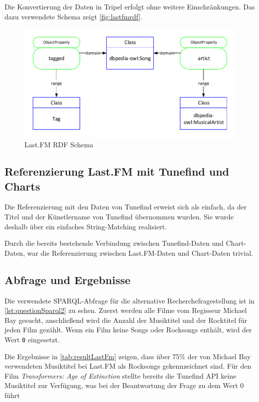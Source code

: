\documentclass[parskip]{scrartcl}
\begin{document}


Die Konvertierung der Daten in Tripel erfolgt ohne weitere Einschränkungen. Das dazu verwendete Schema zeigt \autoref{fig:lastfmrdf}.

\begin{figure}[H]
    \centering
    \includegraphics[scale=0.8]{lastfm}
    \caption{Last.FM RDF Schema}
    \label{fig:lastfmrdf}
\end{figure}

\subsection{Referenzierung Last.FM mit Tunefind und Charts}

Die Referenzierung mit den Daten von Tunefind erweist sich als einfach, da der Titel und der Künstlername von Tunefind übernommen wurden. Sie wurde deshalb über ein einfaches String-Matching realisiert.

Durch die bereits bestehende Verbindung zwischen Tunefind-Daten und Chart-Daten, war die Referenzierung zwischen Last.FM-Daten und Chart-Daten trivial.

\subsection{Abfrage und Ergebnisse}

Die verwendete SPARQL-Abfrage für die alternative Recherchefragestellung ist in \autoref{lst:questionSparql2} zu sehen. Zuerst werden alle Filme vom Regisseur Michael Bay gesucht, anschließend wird die Anzahl der Musiktitel und der Rocktitel für jeden Film gezählt. Wenn ein Film keine Songs oder Rocksongs enthält, wird der Wert \texttt{0} eingesetzt.

Die Ergebnisse in \autoref{tab:resultLastFm} zeigen, dass über 75\% der von Michael Bay verwendeten Musiktitel bei Last.FM als Rocksongs gekennzeichnet sind. Für den Film \textit{Transformers: Age of Extinction} stellte bereits die Tunefind API keine Musiktitel zur Verfügung, was bei der Beantwortung der Frage zu dem Wert 0 führt
\end{document}
